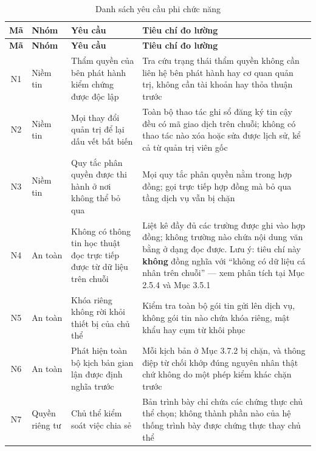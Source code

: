 \begin{longtable}{|c|p{2.6cm}|p{4.6cm}|p{5.4cm}|}
\caption{Danh sách yêu cầu phi chức năng}
\label{tab:non-functional-requirements} \\

\hline
\textbf{Mã} & \textbf{Nhóm} & \textbf{Yêu cầu} & \textbf{Tiêu chí đo lường} \\
\hline
\endfirsthead

\hline
\textbf{Mã} & \textbf{Nhóm} & \textbf{Yêu cầu} & \textbf{Tiêu chí đo lường} \\
\hline
\endhead

\hline
\endfoot

\hline
\endlastfoot

N1 & Niềm tin &
Thẩm quyền của bên phát hành kiểm chứng được độc lập &
Tra cứu trạng thái thẩm quyền không cần liên hệ bên phát hành hay cơ quan quản trị, không cần tài khoản hay thỏa thuận trước \\ \hline

N2 & Niềm tin &
Mọi thay đổi quản trị để lại dấu vết bất biến &
Toàn bộ thao tác ghi sổ đăng ký tin cậy đều có mã giao dịch trên chuỗi; không có thao tác nào xóa hoặc sửa được lịch sử, kể cả từ quản trị viên gốc \\ \hline

N3 & Niềm tin &
Quy tắc phân quyền được thi hành ở nơi không thể bỏ qua &
Mọi quy tắc phân quyền nằm trong hợp đồng; gọi trực tiếp hợp đồng mà bỏ qua tầng dịch vụ vẫn bị chặn \\ \hline

N4 & An toàn &
Không có thông tin học thuật đọc trực tiếp được từ dữ liệu trên chuỗi &
Liệt kê đầy đủ các trường được ghi vào hợp đồng; không trường nào chứa nội dung văn bằng ở dạng đọc được. Lưu ý: tiêu chí này \textbf{không} đồng nghĩa với {``}không có dữ liệu cá nhân trên chuỗi{''} --- xem phân tích tại Mục 2.5.4 và Mục 3.5.1 \\ \hline

N5 & An toàn &
Khóa riêng không rời khỏi thiết bị của chủ thể &
Kiểm tra toàn bộ gói tin gửi lên dịch vụ, không gói tin nào chứa khóa riêng, mật khẩu hay cụm từ khôi phục \\ \hline

N6 & An toàn &
Phát hiện toàn bộ kịch bản gian lận được định nghĩa trước &
Mỗi kịch bản ở Mục 3.7.2 bị chặn, và thông điệp từ chối khớp đúng nguyên nhân thật chứ không do một phép kiểm khác chặn trước \\ \hline

N7 & Quyền riêng tư &
Chủ thể kiểm soát việc chia sẻ &
Bản trình bày chỉ chứa các chứng thực chủ thể chọn; không thành phần nào của hệ thống trình bày được chứng thực thay chủ thể \\ \hline


\end{longtable}
